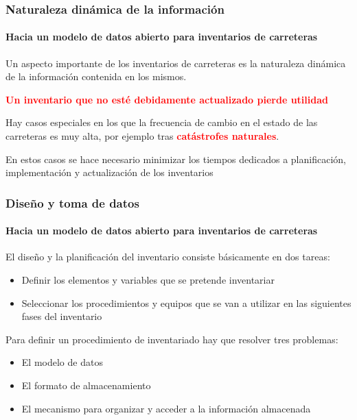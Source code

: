 \documentclass[aspectratio = 169, 12pt]{beamer}
\begin{document}
\begin{frame}
	\frametitle{Naturaleza dinámica de la información}
	\framesubtitle{Hacia un modelo de datos abierto para inventarios de carreteras}

	Un aspecto importante de los inventarios de carreteras es la naturaleza dinámica de la información contenida en los mismos.

	\vspace{1em}
	\textcolor{red}{\textbf{Un inventario que no esté debidamente actualizado pierde utilidad}}

	\vspace{1em}
	Hay casos especiales en los que la frecuencia de cambio en el estado de las carreteras es muy alta, por ejemplo tras \textcolor{red}{\textbf{catástrofes naturales}}.

	\vspace{1em}
	En estos casos se hace necesario minimizar los tiempos dedicados a planificación, implementación y actualización de los inventarios
\end{frame}

\begin{frame}
	\frametitle{Diseño y toma de datos}
	\framesubtitle{Hacia un modelo de datos abierto para inventarios de carreteras}
	El diseño y la planificación del inventario consiste básicamente en dos tareas:

	\vspace{1em}
	\begin{itemize}
		\item Definir los elementos y variables que se pretende inventariar
		\item Seleccionar los procedimientos y equipos que se van a utilizar en las siguientes fases del inventario
	\end{itemize}

	\vspace{1em}
	Para definir un procedimiento de inventariado hay que resolver tres problemas:
	\begin{itemize}
		\item El modelo de datos
		\item El formato de almacenamiento
		\item El mecanismo para organizar y acceder a la información almacenada
	\end{itemize}

\end{frame}
\end{document}
